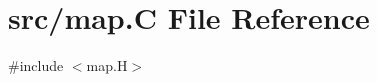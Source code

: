 \hypertarget{map_8_c}{}\section{src/map.C File Reference}
\label{map_8_c}
{\ttfamily \#include $<$map.\+H$>$}\newline
